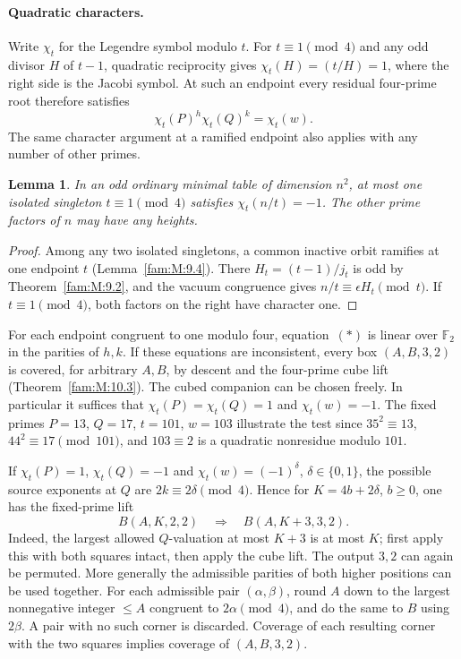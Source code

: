 \documentclass[11pt,a4paper]{article}
\numberwithin{equation}{section}
\newtheorem{lemma}[theorem]{Lemma}
\theoremstyle{remark}
\begin{document}
\paragraph{Quadratic characters.}
Write $\chi_t$ for the Legendre symbol modulo $t$. For $t\equiv1\pmod4$
and any odd divisor $H$ of $t-1$, quadratic reciprocity gives
$\chi_t(H)=(t/H)=1$, where the right side is the Jacobi symbol.
At such an endpoint every residual four-prime root therefore satisfies
\[
             \chi_t(P)^h\chi_t(Q)^k=\chi_t(w).                 \tag{*}
\]
The same character argument at a ramified endpoint also applies
with any number of other primes.

\begin{lemma}\label{ext:lem:quadratic-pair}
In an odd ordinary minimal table of dimension $n^2$, at most one
isolated singleton $t\equiv1\pmod4$ satisfies $\chi_t(n/t)=-1$.
The other prime factors of $n$ may have any heights.
\end{lemma}
\begin{proof}
Among any two isolated singletons, a common inactive orbit
ramifies at one endpoint $t$ (Lemma~\ref{fam:M:9.4}). There
$H_t=(t-1)/j_t$ is odd by Theorem~\ref{fam:M:9.2}, and the vacuum
congruence gives $n/t\equiv\epsilon H_t\pmod t$. If $t\equiv1\pmod4$,
both factors on the right have character one.
\end{proof}

For each endpoint congruent to one modulo four, equation~$(*)$
is linear over $\mathbb F_2$ in the parities of $h,k$.
If these equations are inconsistent, every box
$(A,B,3,2)$ is covered, for arbitrary $A,B$, by descent and
the four-prime cube lift (Theorem~\ref{fam:M:10.3}). The cubed companion
can be chosen freely. In particular it suffices that
$\chi_t(P)=\chi_t(Q)=1$ and $\chi_t(w)=-1$.
The fixed primes $P=13$, $Q=17$, $t=101$, $w=103$ illustrate the
test since $35^2\equiv13$, $44^2\equiv17\pmod{101}$, and $103\equiv2$
is a quadratic nonresidue modulo $101$.

If $\chi_t(P)=1$, $\chi_t(Q)=-1$ and
$\chi_t(w)=(-1)^\delta$, $\delta\in\{0,1\}$,
the possible source exponents at $Q$ are $2k\equiv2\delta\pmod4$.
Hence for $K=4b+2\delta$, $b\ge0$, one has the fixed-prime lift
\[
           B(A,K,2,2)\quad\Longrightarrow\quad B(A,K+3,3,2).
\]
Indeed, the largest allowed $Q$-valuation at most $K+3$ is at
most $K$; first apply this with both squares intact, then apply
the cube lift. The output $3,2$ can again be permuted.
More generally the admissible parities of both higher positions
can be used together. For each admissible pair $(\alpha,\beta)$,
round $A$ down to the largest nonnegative integer
$\le A$ congruent to $2\alpha\pmod4$, and do the same to $B$
using $2\beta$. A pair with no such corner is discarded.
Coverage of each resulting corner with the two squares implies
coverage of $(A,B,3,2)$.
\end{document}
